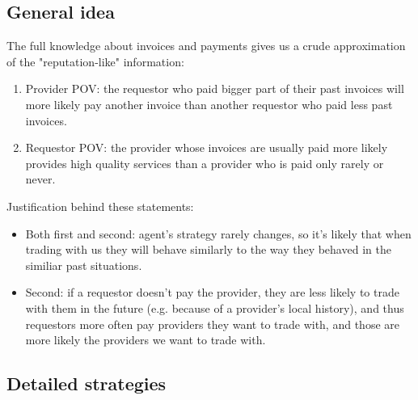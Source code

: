 \documentclass{article}
\begin{document}
\subsection{General idea}

The full knowledge about invoices and payments gives us a crude approximation of the "reputation-like" information:
\begin{enumerate}
    \item Provider POV: the requestor who paid bigger part of their past invoices will more likely pay another invoice than another requestor
        who paid less past invoices.
    \item Requestor POV: the provider whose invoices are usually paid more likely provides high quality services than a provider who is paid
        only rarely or never.
\end{enumerate}

Justification behind these statements:
\begin{itemize}
    \item Both first and second: agent's strategy rarely changes, so it's likely that when trading with us
        they will behave similarly to the way they behaved in the similiar past situations.
    \item Second: if a requestor doesn't pay the provider, they are less likely to trade with them in the future (e.g. because of a provider's local history), 
        and thus requestors more often pay providers they want to trade with, and those are more likely the providers we want to trade with.
\end{itemize}

\subsection{Detailed strategies}
\end{document}
